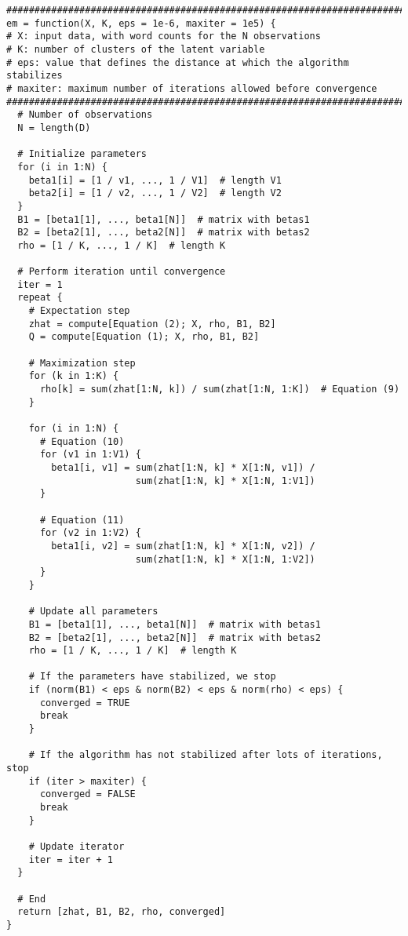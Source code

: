 \documentclass[a4paper, 11pt]{article}
\begin{document}
\begin{verbatim}
################################################################################
em = function(X, K, eps = 1e-6, maxiter = 1e5) {
# X: input data, with word counts for the N observations
# K: number of clusters of the latent variable
# eps: value that defines the distance at which the algorithm stabilizes
# maxiter: maximum number of iterations allowed before convergence
################################################################################  
  # Number of observations
  N = length(D)

  # Initialize parameters
  for (i in 1:N) {
    beta1[i] = [1 / v1, ..., 1 / V1]  # length V1
    beta2[i] = [1 / v2, ..., 1 / V2]  # length V2
  }
  B1 = [beta1[1], ..., beta1[N]]  # matrix with betas1
  B2 = [beta2[1], ..., beta2[N]]  # matrix with betas2
  rho = [1 / K, ..., 1 / K]  # length K

  # Perform iteration until convergence
  iter = 1
  repeat {
    # Expectation step
    zhat = compute[Equation (2); X, rho, B1, B2]
    Q = compute[Equation (1); X, rho, B1, B2]

    # Maximization step
    for (k in 1:K) {
      rho[k] = sum(zhat[1:N, k]) / sum(zhat[1:N, 1:K])  # Equation (9)
    }

    for (i in 1:N) {
      # Equation (10)
      for (v1 in 1:V1) {
        beta1[i, v1] = sum(zhat[1:N, k] * X[1:N, v1]) /
                       sum(zhat[1:N, k] * X[1:N, 1:V1])
      }

      # Equation (11)
      for (v2 in 1:V2) {
        beta1[i, v2] = sum(zhat[1:N, k] * X[1:N, v2]) /
                       sum(zhat[1:N, k] * X[1:N, 1:V2])
      }
    }

    # Update all parameters
    B1 = [beta1[1], ..., beta1[N]]  # matrix with betas1
    B2 = [beta2[1], ..., beta2[N]]  # matrix with betas2
    rho = [1 / K, ..., 1 / K]  # length K

    # If the parameters have stabilized, we stop
    if (norm(B1) < eps & norm(B2) < eps & norm(rho) < eps) {
      converged = TRUE
      break
    }

    # If the algorithm has not stabilized after lots of iterations, stop
    if (iter > maxiter) {
      converged = FALSE
      break
    }

    # Update iterator
    iter = iter + 1
  }

  # End
  return [zhat, B1, B2, rho, converged]
}
\end{verbatim}
\end{document}
